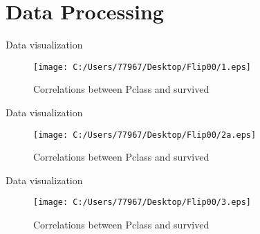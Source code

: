 \documentclass[
size=14pt,
paper=smartboard,  %
mode=present, 		%
display=slides, 	%
style=tuliplab,  	%
pauseslide,
fleqn,leqno]{powerdot}
\begin{document}
	\section{Data Processing}
	
	\begin{slide}{Data visualization}
		\begin{center}
			\begin{figure}
				\setlength{\abovecaptionskip}{0.5cm}
				\centering
				\texttt{[image: C:/Users/77967/Desktop/Flip00/1.eps]}\\	
				\caption{Correlations between Pclass and survived}
				\label{fig:Correlations between individual features and survival}
			\end{figure}
		\end{center}
	\end{slide}
	\begin{slide}{Data visualization}
		\begin{center}
			\begin{figure}
				\setlength{\abovecaptionskip}{0.5cm}
				\centering
				\texttt{[image: C:/Users/77967/Desktop/Flip00/2a.eps]}\\	
				\caption{Correlations between Pclass and survived}
				\label{fig:Correlations between individual features and survival}
			\end{figure}
		\end{center}
	\end{slide}
	\begin{slide}{Data visualization}
		\begin{center}
			\begin{figure}
				\setlength{\abovecaptionskip}{0.5cm}
				\centering
				\texttt{[image: C:/Users/77967/Desktop/Flip00/3.eps]}\\	
				\caption{Correlations between Pclass and survived}
				\label{fig:Correlations between individual features and survival}
			\end{figure}
		\end{center}
	\end{slide}
\end{document}
